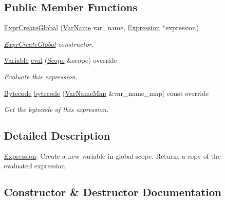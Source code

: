 \subsection*{Public Member Functions}
\begin{DoxyCompactItemize}
\item 
\hyperlink{classcreek_1_1_expr_create_global_a6af42083554395f193d4b95ca7389381}{Expr\+Create\+Global} (\hyperlink{classcreek_1_1_var_name}{Var\+Name} var\+\_\+name, \hyperlink{classcreek_1_1_expression}{Expression} $\ast$expression)
\begin{DoxyCompactList}\small\item\em {\ttfamily \hyperlink{classcreek_1_1_expr_create_global}{Expr\+Create\+Global}} constructor. \end{DoxyCompactList}\item 
\hyperlink{classcreek_1_1_variable}{Variable} \hyperlink{classcreek_1_1_expr_create_global_afb61097d41d367ea41be1cd66a3ef2bb}{eval} (\hyperlink{classcreek_1_1_scope}{Scope} \&scope) override
\begin{DoxyCompactList}\small\item\em Evaluate this expression. \end{DoxyCompactList}\item 
\hyperlink{classcreek_1_1_bytecode}{Bytecode} \hyperlink{classcreek_1_1_expr_create_global_a35e0b72f7b135ee43e3fd5dd513afedf}{bytecode} (\hyperlink{classcreek_1_1_var_name_map}{Var\+Name\+Map} \&var\+\_\+name\+\_\+map) const  override\hypertarget{classcreek_1_1_expr_create_global_a35e0b72f7b135ee43e3fd5dd513afedf}{}\label{classcreek_1_1_expr_create_global_a35e0b72f7b135ee43e3fd5dd513afedf}

\begin{DoxyCompactList}\small\item\em Get the bytecode of this expression. \end{DoxyCompactList}\end{DoxyCompactItemize}


\subsection{Detailed Description}
\hyperlink{classcreek_1_1_expression}{Expression}\+: Create a new variable in global scope. Returns a copy of the evaluated expression. 

\subsection{Constructor \& Destructor Documentation}
